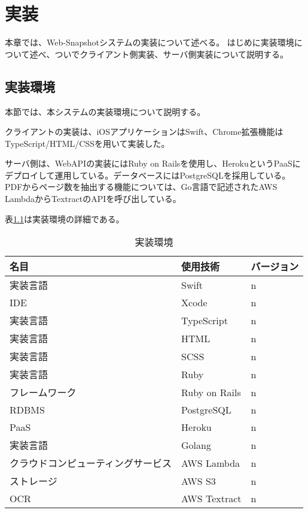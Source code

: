 \chapter{実装}
\label{chap:implementation}
本章では、Web-Snapshotシステムの実装について述べる。
はじめに実装環境について述べ、ついでクライアント側実装、サーバ側実装について説明する。

\section{実装環境}
本節では、本システムの実装環境について説明する。

クライアントの実装は、iOSアプリケーションはSwift、Chrome拡張機能はTypeScript/HTML/CSSを用いて実装した。

サーバ側は、WebAPIの実装にはRuby on Railsを使用し、Heroku\cite{}というPaaSにデプロイして運用している。データベースにはPostgreSQLを採用している。
PDFからページ数を抽出する機能については、Go言語で記述されたAWS LambdaからTextract\cite{}のAPIを呼び出している。

表\ref{tb:implementation-env}は実装環境の詳細である。

\begin{table}[htbp]
  \label{tb:implementation-env}
  \caption{実装環境}
  \begin{center}
    \begin{tabular}{|l|l|l|}
    \hline
    名目 & 使用技術 & バージョン \\ \hline
    実装言語 & Swift & n \\ \hline
    IDE & Xcode & n \\ \hline
    実装言語 & TypeScript & n \\ \hline
    実装言語 & HTML & n \\ \hline
    実装言語 & SCSS & n \\ \hline
    実装言語 & Ruby & n \\ \hline
    フレームワーク & Ruby on Rails & n \\ \hline
    RDBMS & PostgreSQL & n \\ \hline
    PaaS & Heroku & n \\ \hline
    実装言語 & Golang & n \\ \hline
    クラウドコンピューティングサービス & AWS Lambda & n \\ \hline
    ストレージ & AWS S3 & n \\ \hline
    OCR & AWS Textract & n \\ \hline
    \end{tabular}
  \end{center}
\end{table}

